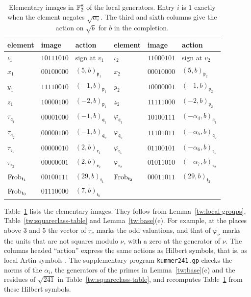 \begin{table}[htbp]
\centering
\caption{Elementary images in $\mathbb F_2^8$ of the local generators. Entry $i$
is $1$ exactly when the element negates $\sqrt{\alpha_i}$. The third and
sixth columns give the action on $\sqrt b$ for $b$ in the completion.}
\label{tw:vector-table}
\begin{tabular}{lll@{\qquad}lll}
\toprule
element & image & action & element & image & action\\
\midrule
$\iota_1$ & $10111010$ & sign at $v_1$ & $\iota_2$ & $11000101$ & sign at $v_2$\\
$x_1$ & $00100000$ & $(5,b)_{\mathfrak p_1}$ & $x_2$ & $00010000$ & $(5,b)_{\mathfrak p_2}$\\
$y_1$ & $11110010$ & $(-1,b)_{\mathfrak p_1}$ & $y_2$ & $10000001$ & $(-1,b)_{\mathfrak p_2}$\\
$z_1$ & $10000100$ & $(-2,b)_{\mathfrak p_1}$ & $z_2$ & $11111000$ & $(-2,b)_{\mathfrak p_2}$\\
$\tau_{\mathfrak q_1}$ & $00001000$ & $(-1,b)_{\mathfrak q_1}$ & $\varphi_{\mathfrak q_1}$ & $10100111$ & $(-\alpha_4,b)_{\mathfrak q_1}$\\
$\tau_{\mathfrak q_2}$ & $00000100$ & $(-1,b)_{\mathfrak q_2}$ & $\varphi_{\mathfrak q_2}$ & $11101011$ & $(-\alpha_5,b)_{\mathfrak q_2}$\\
$\tau_{\mathfrak r_1}$ & $00000010$ & $(2,b)_{\mathfrak r_1}$ & $\varphi_{\mathfrak r_1}$ & $01100101$ & $(-\alpha_6,b)_{\mathfrak r_1}$\\
$\tau_{\mathfrak r_2}$ & $00000001$ & $(2,b)_{\mathfrak r_2}$ & $\varphi_{\mathfrak r_2}$ & $01011010$ & $(-\alpha_7,b)_{\mathfrak r_2}$\\
$\operatorname{Frob}_{\mathfrak t_1}$ & $00100111$ & $(29,b)_{\mathfrak t_1}$ & $\operatorname{Frob}_{\mathfrak t_2}$ & $00011011$ & $(29,b)_{\mathfrak t_2}$\\
$\operatorname{Frob}_{\mathfrak t_0}$ & $01110000$ & $(7,b)_{\mathfrak t_0}$ & & &\\
\bottomrule
\end{tabular}
\end{table}

Table~\ref{tw:vector-table} lists the elementary images. They follow from
Lemma~\ref{tw:local-groups}, Table~\ref{tw:squareclass-table} and
Lemma~\ref{tw:base}(e). For
example, at the places above $3$ and $5$ the vector of $\tau_\nu$ marks the
odd valuations, and that of $\varphi_\nu$ marks the units that are not
squares modulo $\nu$, with a zero at the generator of $\nu$. The columns
headed ``action'' express the same actions as Hilbert symbols, that is, as
local Artin symbols \cite[Chapter~III, Remark~4.5]{MilneCFT}. The
supplementary program \texttt{kummer241.gp} checks the norms of the
$\alpha_i$, the generators of the primes in Lemma~\ref{tw:base}(c) and the
residues of $\sqrt{241}$ in Table~\ref{tw:squareclass-table}, and recomputes
Table~\ref{tw:vector-table} from these Hilbert symbols.

